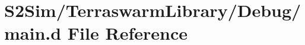 \hypertarget{_terraswarm_library_2_debug_2main_8d}{\section{S2\-Sim/\-Terraswarm\-Library/\-Debug/main.d File Reference}
\label{_terraswarm_library_2_debug_2main_8d}
}
